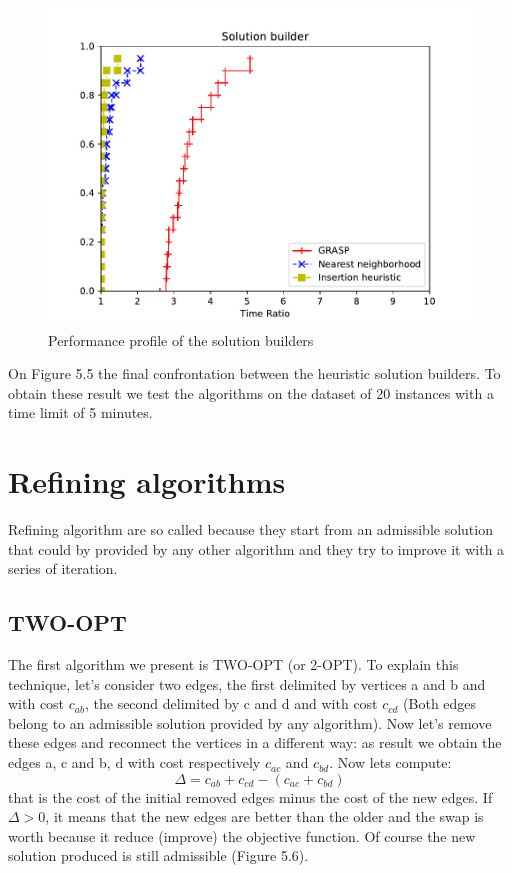 \begin{figure}[h!]
	\centering
	\includegraphics[scale=0.8]{media/builder.pdf}
	\caption{Performance profile of the solution builders}
\end{figure}
\noindent
On Figure 5.5 the final confrontation between the heuristic solution builders. To obtain these result we test the algorithms on the dataset of 20 instances with a time limit of 5 minutes. 

\clearpage

\section{Refining algorithms}
Refining algorithm are so called because they start from an admissible solution that could by provided by any other algorithm and they try to improve it with a series of iteration.

\subsection{TWO-OPT}
The first algorithm we present is TWO-OPT (or 2-OPT). To explain this technique, let's consider two edges, the first delimited by vertices a and b and with cost $c_{ab}$, the second delimited by c and d and with cost $c_{cd}$ (Both edges belong to an admissible solution provided by any algorithm). Now let's remove these edges and reconnect the vertices in a different way: as result we obtain the edges a, c and b, d with cost respectively $c_{ac}$ and $c_{bd}$. Now lets compute: 
\begin{equation*}
\Delta = c_{ab} + c_{cd} - (c_{ac} + c_{bd})
\end{equation*}
that is the cost of the initial removed edges minus the cost of the new edges. If $\Delta > 0$, it means that the new edges are better than the older and the swap is worth because it reduce (improve) the objective function. Of course the new solution produced is still admissible (Figure 5.6).\\

